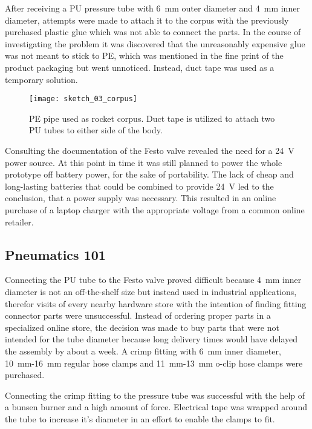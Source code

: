After receiving a PU pressure tube with \SI{6}{\milli\meter} outer diameter and \SI{4}{\milli\meter} inner diameter, attempts were made to attach it to the corpus with the previously purchased plastic glue which was not able to connect the parts. In the course of investigating the problem it was discovered that the unreasonably expensive glue was not meant to stick to PE, which was mentioned in the fine print of the product packaging but went unnoticed. Instead, duct tape was used as a temporary solution. 

\begin{figure}[h]
\centering

\texttt{[image: sketch\_03\_corpus]}

\caption{PE pipe used as rocket corpus. Duct tape is utilized to attach two PU tubes to either side of the body.}
\end{figure}

Consulting the documentation of the Festo valve revealed the need for a \SI{24}{\volt} power source. At this point in time it was still planned to power the whole prototype off battery power, for the sake of portability. The lack of cheap and long-lasting batteries that could be combined to provide \SI{24}{\volt} led to the conclusion, that a power supply was necessary. This resulted in an online purchase of a laptop charger \cite{power-supply} with the appropriate voltage from a common online retailer.

\subsection{Pneumatics 101}
Connecting the PU tube to the Festo valve proved difficult because \SI{4}{\milli\meter} inner diameter is not an off-the-shelf size but instead used in industrial applications, therefor visits of every nearby hardware store with the intention of finding fitting connector parts were unsuccessful. Instead of ordering proper parts in a specialized online store, the decision was made to buy parts that were not intended for the tube diameter because long delivery times would have delayed the assembly by about a week. A crimp fitting with \SI{6}{\milli\meter} inner diameter, \SI{10}{\milli\meter}-\SI{16}{\milli\meter} regular hose clamps and \SI{11}{\milli\meter}-\SI{13}{\milli\meter} o-clip hose clamps were purchased. 

Connecting the crimp fitting to the pressure tube was successful with the help of a bunsen burner and a high amount of force. Electrical tape was wrapped around the tube to increase it's diameter in an effort to enable the clamps to fit.

